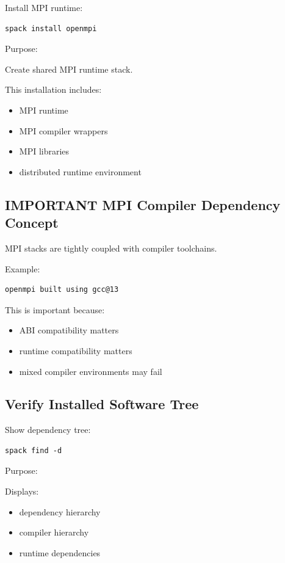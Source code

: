 \documentclass[11pt]{article}
\begin{document}
Install MPI runtime:

\begin{verbatim}
spack install openmpi
\end{verbatim}

Purpose:

Create shared MPI runtime stack.

This installation includes:

\begin{itemize}
\item MPI runtime
\item MPI compiler wrappers
\item MPI libraries
\item distributed runtime environment
\end{itemize}
\subsection{IMPORTANT MPI Compiler Dependency Concept}
\label{sec:org550054b}

MPI stacks are tightly coupled with compiler toolchains.

Example:

\begin{verbatim}
openmpi built using gcc@13
\end{verbatim}

This is important because:

\begin{itemize}
\item ABI compatibility matters
\item runtime compatibility matters
\item mixed compiler environments may fail
\end{itemize}
\subsection{Verify Installed Software Tree}
\label{sec:orgdb4f11c}

Show dependency tree:

\begin{verbatim}
spack find -d
\end{verbatim}

Purpose:

Displays:

\begin{itemize}
\item dependency hierarchy
\item compiler hierarchy
\item runtime dependencies
\end{itemize}
\end{document}
